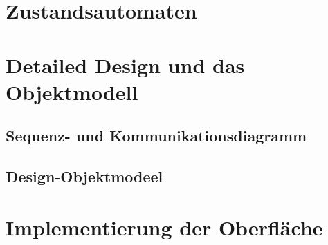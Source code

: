 \section{Zustandsautomaten}

\section{Detailed Design und das Objektmodell}

\subsection{Sequenz- und Kommunikationsdiagramm}

\subsection{Design-Objektmodeel}

\section{Implementierung der Oberfläche}
